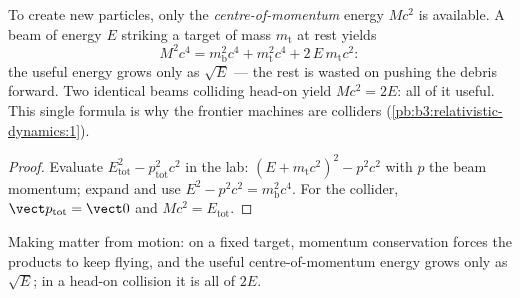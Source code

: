 \begin{proposition}\label{prop:b3:relativistic-dynamics:threshold}
To create new particles, only the \emph{centre-of-momentum} energy
$Mc^2$ is available. A beam of energy $E$ striking a target of mass
$m_{\text{t}}$ at rest yields
\[
M^2c^4 = m_{\text{b}}^2c^4 + m_{\text{t}}^2c^4 +
2\,E\,m_{\text{t}}c^2 :
\]
the useful energy grows only as $\sqrt E$ --- the rest is wasted on
pushing the debris forward. Two identical beams colliding head-on
yield $Mc^2 = 2E$: all of it useful. This single formula is why the
frontier machines are colliders
(\cref{pb:b3:relativistic-dynamics:1}).
\end{proposition}

\begin{proof}
Evaluate $E_{\text{tot}}^2 - p_{\text{tot}}^2c^2$ in the lab:
$(E + m_{\text{t}}c^2)^2 - p^2c^2$ with $p$ the beam momentum; expand
and use $E^2 - p^2c^2 = m_{\text{b}}^2c^4$. For the collider,
$\vect p_{\text{tot}} = \vect 0$ and $Mc^2 = E_{\text{tot}}$.
\end{proof}

\begin{omfigure}

{\small Making matter from motion: on a fixed target, momentum
conservation forces the products to keep flying, and the useful
centre-of-momentum energy grows only as $\sqrt E$; in a head-on
collision it is all of $2E$.}
\end{omfigure}

